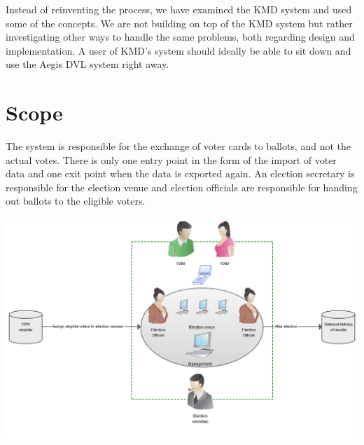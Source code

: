 \documentclass[a4paper]{report}
\begin{document}
Instead of reinventing the process, we have examined the KMD system and used some of the concepts. We are not building on top of the KMD system but rather investigating other ways to handle the same problems, both regarding design and implementation. A user of KMD's system should ideally be able to sit down and use the Aegis DVL system right away. 

\chapter{Scope}
The system is responsible for the exchange of voter cards to ballots, and not the actual votes. There is only one entry point in the form of the import of voter data and one exit point when the data is exported again. An election secretary is responsible for the election venue and election officials are responsible for handing out ballots to the eligible voters.
\begin{center}
\includegraphics[width=\textwidth]{Domain.jpg}
\end{center}
\end{document}
